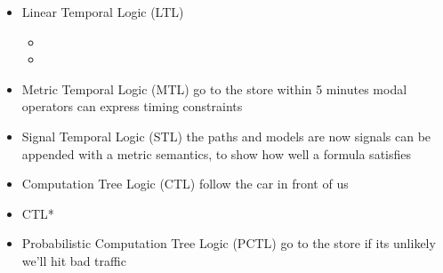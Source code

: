 \documentclass[a4paper, 11pt]{article}
\begin{document}
\begin{itemize}
\item Linear Temporal Logic (LTL)
\begin{itemize}
\item 
\item
\end{itemize}
\item Metric Temporal Logic (MTL)
  go to the store within 5 minutes
  modal operators can express timing constraints
\item Signal Temporal Logic (STL)
  the paths and models are now signals
  can be appended with a metric semantics, to show how well a formula satisfies
\item Computation Tree Logic (CTL)
  follow the car in front of us 
\item CTL*
\item Probabilistic Computation Tree Logic (PCTL) 
  go to the store if its unlikely we'll hit bad traffic
\end{itemize}








\end{document}
